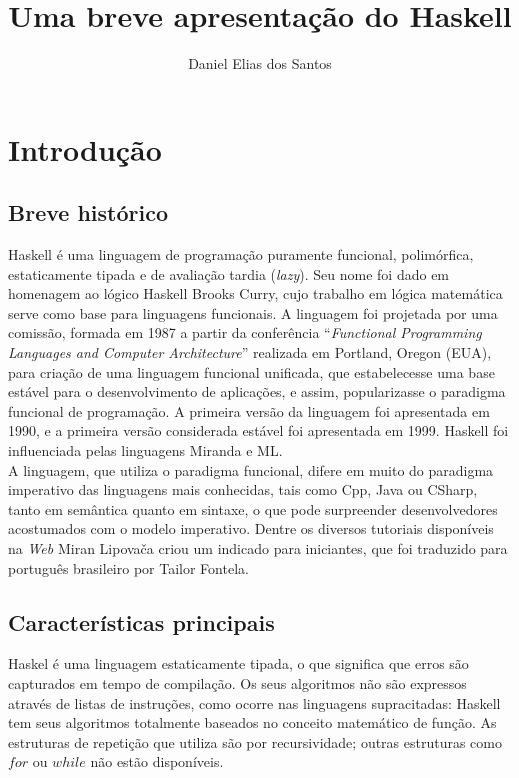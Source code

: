 \documentclass[12pt]{article}
\title{Uma breve apresentação do Haskell}
\author{Daniel Elias dos Santos\inst{1}}
\begin{document}
 
	
	\maketitle

	\section{Introdução}
		\subsection{Breve histórico}
			Haskell é uma linguagem de programação puramente funcional, polimórfica, estaticamente tipada e de avaliação tardia (\textit{lazy})\textsuperscript{\cite{haskellWiki}}. Seu nome foi dado em homenagem ao lógico Haskell Brooks Curry, cujo trabalho em lógica matemática serve como base para linguagens funcionais. A linguagem foi projetada por uma comissão, formada em 1987 a partir da conferência ``\textit{Functional Programming Languages and Computer Architecture}'' realizada em Portland, Oregon (EUA), para criação de uma linguagem funcional unificada, que estabelecesse uma base estável para o desenvolvimento de aplicações, e assim, popularizasse o paradigma funcional de programação\textsuperscript{\cite{histHas2007}}. A primeira versão da linguagem foi apresentada em 1990, e a primeira versão considerada estável foi apresentada em 1999. Haskell foi influenciada pelas linguagens Miranda e ML.\\
			
			A linguagem, que utiliza o paradigma funcional, difere em muito do paradigma imperativo das linguagens mais conhecidas, tais como Cpp, Java ou CSharp, tanto em semântica quanto em sintaxe, o que pode surpreender desenvolvedores acostumados com o modelo imperativo. Dentre os diversos tutoriais disponíveis na \textit{Web} Miran Lipovača\textsuperscript{\cite{guiaEng}} criou um indicado para iniciantes, que foi traduzido para português brasileiro por Tailor Fontela\textsuperscript{\cite{guiaPtBr}}.
		\subsection{Características principais}
			Haskel é uma linguagem estaticamente tipada, o que significa que erros são capturados em tempo de compilação. Os seus algoritmos não são expressos através de listas de instruções, como ocorre nas linguagens supracitadas: Haskell tem seus algoritmos totalmente baseados no conceito matemático de função. As estruturas de repetição que utiliza são por recursividade; outras estruturas como $for$ ou $while$ não estão disponíveis.
			
\end{document}

